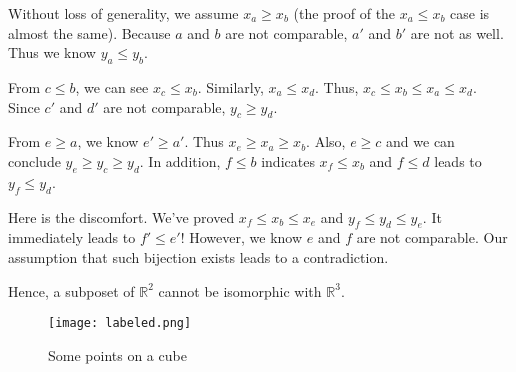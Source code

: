 \documentclass[UTF8]{ctexart}
\theoremstyle{definition}
\begin{document}
Without loss of generality, we assume $x_a \geq x_b$ (the proof of the $x_a \leq x_b$ case is almost the same). Because $a$ and $b$ are not comparable, $a'$ and $b'$ are not as well. 
Thus we know $y_a \leq y_b$.

From $c \leq b$, we can see $x_c \leq x_b$. Similarly, $x_a \leq x_d$. Thus, $x_c \leq x_b \leq x_a \leq x_d$. Since $c'$ and $d'$ are not comparable, $y_c \geq y_d$.


From $e \geq a$, we know $e' \geq a'$. Thus $x_e \geq x_a \geq x_b$.
Also, $e \geq c$ and we can conclude $y_e \geq y_c \geq y_d$.
In addition, $f \leq b$ indicates $x_f \leq x_b$ and $f \leq d$ leads to $y_f \leq y_d$.

Here is the discomfort. We've proved $x_f \leq x_b \leq x_e$ and $y_f \leq y_d \leq y_e$. It immediately leads to $f' \leq e'$! However, we know $e$ and $f$ are not comparable. Our assumption that such bijection exists leads to a contradiction.

Hence, a subposet of $\mathbb{R}^2$ cannot be isomorphic with $\mathbb{R}^3$.



\begin{figure}[ht]
    \centering
    \texttt{[image: labeled.png]}
    \caption{Some points on a cube}
\end{figure}

\end{document}
